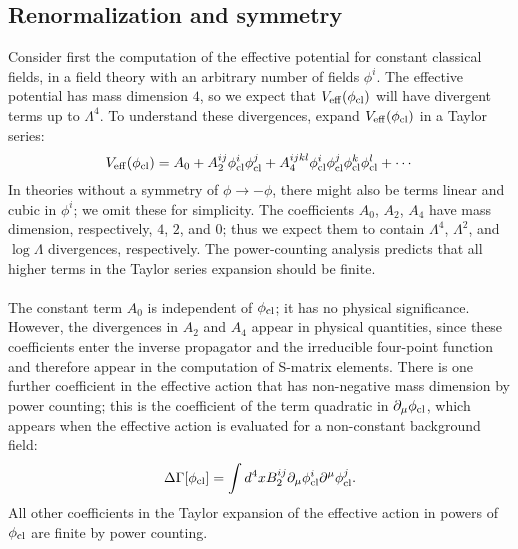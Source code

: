 \subsection{Renormalization and symmetry}
Consider first the computation of the effective potential for constant classical fields, in a field theory with an arbitrary number of fields $\phi^i$. The effective potential has mass dimension $4$, so we expect that $V_{\rm eff}(\phi_{\rm cl})$ will have divergent terms up to $\Lambda^4$. To understand these divergences,
expand $V_{\rm eff}(\phi_{\rm cl})$ in a Taylor series:
\[V_{\rm eff}(\phi_{\rm cl}) = A_0 + A_2^{ij}\phi_{\rm cl}^i \phi_{\rm cl}^j + A_4^{ijkl} \phi_{\rm cl}^i \phi_{\rm cl}^j \phi_{\rm cl}^k \phi_{\rm cl}^l + \cdots\]
In theories without a symmetry of $\phi \to -\phi$, there might also be terms linear and cubic in $\phi^i$; we omit these for simplicity. The coefficients $A_0$, $A_2$, $A_4$ have mass dimension, respectively, $4$, $2$, and $0$; thus we expect them to contain $\Lambda^4$, $\Lambda^2$, and $\log \Lambda$ divergences, respectively. The power-counting analysis predicts that all higher terms in the Taylor series expansion should be finite.
\\ \\
The constant term $A_0$ is independent of $\phi_{\rm cl}$; it has no physical significance. However, the divergences in $A_2$ and $A_4$ appear in physical quantities, since these coefficients enter the inverse propagator and the irreducible four-point function and therefore appear in the computation of S-matrix elements. There is one further coefficient in the effective action that has non-negative mass dimension by power counting; this is the coefficient of the term quadratic in $\partial_{\mu} \phi_{\rm cl}$, which appears when the effective action is evaluated for a non-constant background field:
\[\Delta \Gamma [\phi_{\rm cl}] = \int d^4x B_2^{ij} \partial_{\mu} \phi_{\rm cl}^i \partial^{\mu} \phi_{\rm cl}^j.\]
All other coefficients in the Taylor expansion of the effective action in powers of $\phi_{\rm cl}$ are finite by power counting.
\\ \\
